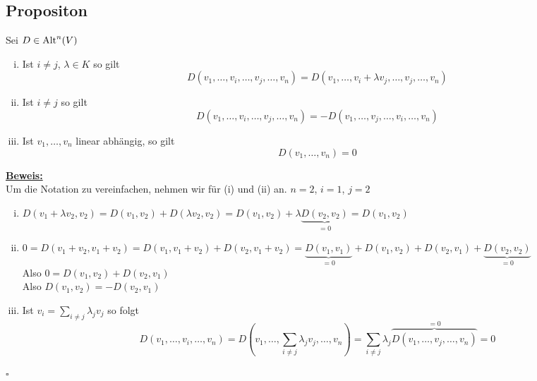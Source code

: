 \subsection{Propositon} %
\label{sub:propositon}
Sei $D \in \operatorname{Alt}^n(V)$
\begin{enumerate}[(i)]
	\item Ist $i \not= j$, $\lambda  \in K$ so gilt 
	\[
		D(v_1, \ldots , v_i, \ldots , v_j , \ldots , v_n) = D(v_1, \ldots , v_i + \lambda v_j, \ldots , v_j , \ldots  , v_n)
	\]
	\item Ist $i\not= j$ so gilt
	\[
		D(v_1, \ldots , v_i , \ldots , v_j , \ldots , v_n)= - D(v_1, \ldots , v_j , \ldots , v_i , \ldots , v_n)
	\]
	\item Ist $v_1, \ldots , v_n$ linear abhängig, so gilt
	\[
		D(v_1, \ldots , v_n) = 0
	\]
\end{enumerate}
\underline{\textbf{Beweis:}} \\
Um die Notation zu vereinfachen, nehmen wir für (i) und (ii) an. $n=2$, $i=1$, $j=2$
\begin{enumerate}[(i)]
	\item $D(v_1 + \lambda v_2 , v_2) = D(v_1 , v_2)+ D(\lambda v_2 , v_2) = D(v_1, v_2)+ \lambda \underbrace{D(v_2 , v_2)}_{=0} = D(v_1 , v_2)$
	\item $0= D(v_1 + v_2, v_1 + v_2)= D(v_1, v_1 + v_2)+ D(v_2, v_1 + v_2) = \underbrace{D(v_1, v_1)}_{=0}+ D(v_1, v_2)+ D(v_2, v_1)+ \underbrace{D(v_2, v_2)}_{=0}$ \\
	Also $0= D(v_1, v_2)+ D(v_2, v_1)$ \\
	Also $D(v_1, v_2)= - D(v_2, v_1)$
	\item Ist $v_i = \sum\limits_{i \not= j} \lambda_j v_j 	 $ so folgt
	\[
		D(v_1, \ldots , v_i, \ldots , v_n) = D(v_1, \ldots , \sum\limits_{i \not= j} \lambda_j v_j , \ldots , v_n ) = \sum\limits_{i \not= j}\lambda_j 
		\overbrace{D(v_1, \ldots , v_j , \ldots , v_n)}^{=0} = 0
	\]
\end{enumerate}
\hfill \( \square \)

